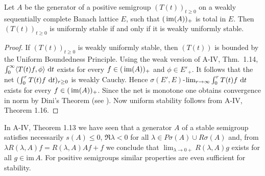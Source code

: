 \begin{proposition}\label{prop:c4-1.7}
%
%
%
Let $A$ be the generator of a positive semigroup $(T(t))_{t\geq 0}$ on a weakly sequentially complete Banach lattice $E$, such that $(\mathop{}\mathrm{im}(A))_{+}$ is total in $E$.
Then $(T(t))_{t\geq 0}$ is uniformly stable if and only if it is weakly uniformly stable.
\end{proposition}
\begin{proof}
If $(T(t))_{t\geq 0}$ is weakly uniformly stable, then $(T(t))$ is bounded by the Uniform Boundedness Principle.
Using the weak version of A-IV, Thm.~1.14, 
$\int_{0}^{\infty} \langle T(t)f,\phi \rangle \, \mathop{}\!\mathrm{d}{t}$ exists for every $f \in (\mathop{}\mathrm{im}(A))_{+}$ and $\phi \in E'_{+}$.
It follows that the net $(\int_{0}^{r} T(t)f \, \mathop{}\!\mathrm{d}{t})_{r\geq 0}$ is weakly Cauchy.
Hence $\sigma(E',E)$-$\lim_{r \to \infty} \int_{0}^{r} T(t)f \, \mathop{}\!\mathrm{d}{t}$ exists for every $f \in (\mathop{}\mathrm{im}(A))_{+}$.
Since the net is monotone one obtains convergence in norm by Dini's Theorem (see \citet [II. Theorem~5.9]{schaefer:1974}).
Now uniform stability follows from A-IV, Theorem 1.16.
\end{proof}
In A-IV, Theorem 1.13 we have seen that a generator $A$ of a stable semigroup satisfies necessarily $s(A) \leq 0$, $\Re \lambda < 0$ for all $\lambda \in P{\sigma}(A) \cup R{\sigma}(A)$ and, from $\lambda R(\lambda,A)f = R(\lambda,A)Af + f$ we conclude that $\lim_{\lambda \to 0+} R(\lambda,A)g$ exists for all $g \in \text{im} \, A$. 
For positive semigroups similar properties are even sufficient for stability.

